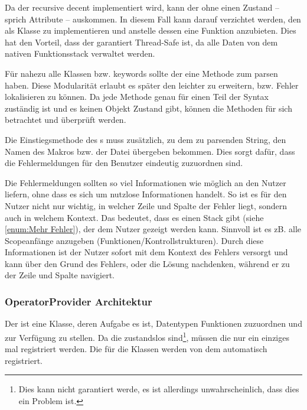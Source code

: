       Da der  recursive decent implementiert wird, kann der  ohne einen Zustand -- sprich Attribute -- auskommen. In diesem Fall kann darauf verzichtet werden, den  als Klasse zu implementieren und anstelle dessen eine  Funktion anzubieten. Dies hat den Vorteil, dass der  garantiert Thread-Safe ist, da alle Daten von dem nativen Funktionsstack verwaltet werden.

      Für nahezu alle  Klassen bzw. keywords sollte der  eine Methode zum parsen haben. Diese Modularität erlaubt es später den  leichter zu erweitern, bzw. Fehler lokalisieren zu können. Da jede Methode genau für einen Teil der Syntax zuständig ist und es keinen Objekt Zustand gibt, können die Methoden für sich betrachtet und überprüft werden.

      Die Einstiegsmethode des s muss zusätzlich, zu dem zu parsenden String, den Namen des Makros bzw. der Datei übergeben bekommen. Dies sorgt dafür, dass die Fehlermeldungen für den Benutzer eindeutig zuzuordnen sind.

      Die Fehlermeldungen sollten so viel Informationen wie möglich an den Nutzer liefern, ohne dass es sich um nutzlose Informationen handelt. So ist es für den Nutzer nicht nur wichtig, in welcher Zeile und Spalte der Fehler liegt, sondern auch in welchem Kontext. Das bedeutet, dass es einen Stack gibt (siehe \ref{enum:Mehr Fehler}), der dem Nutzer gezeigt werden kann. Sinnvoll ist es zB. alle Scopeanfänge anzugeben (Funktionen/Kontrollstrukturen). Durch diese Informationen ist der Nutzer sofort mit dem Kontext des Fehlers versorgt und kann über den Grund des Fehlers, oder die Lösung  nachdenken, während er zu der Zeile und Spalte navigiert.


    \subsubsection{OperatorProvider Architektur}
    \label{sssec:OperatorProvider Architektur}
      Der  ist eine Klasse, deren Aufgabe es ist, Datentypen Funktionen zuzuordnen und zur Verfügung zu stellen. Da die  zustandslos sind\footnote{
        Dies kann nicht garantiert werde, es ist allerdings unwahrscheinlich, dass dies ein Problem ist.
      }, müssen die  nur ein einziges mal registriert werden. Die  für die  Klassen werden von dem  automatisch registriert.

